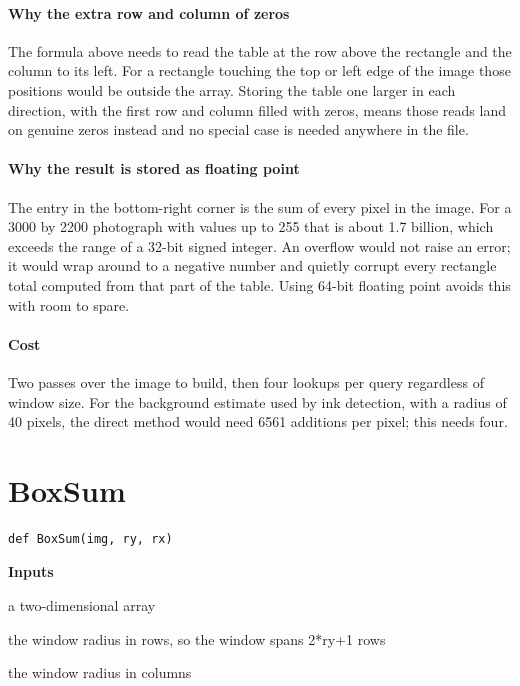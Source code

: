 \paragraph{Why the extra row and column of zeros}
The formula above needs to read the table at the row above the rectangle and the column to its left. For a rectangle touching the top or left edge of the image those positions would be outside the array. Storing the table one larger in each direction, with the first row and column filled with zeros, means those reads land on genuine zeros instead and no special case is needed anywhere in the file.


\paragraph{Why the result is stored as floating point}
The entry in the bottom-right corner is the sum of every pixel in the image. For a 3000 by 2200 photograph with values up to 255 that is about 1.7 billion, which exceeds the range of a 32-bit signed integer. An overflow would not raise an error; it would wrap around to a negative number and quietly corrupt every rectangle total computed from that part of the table. Using 64-bit floating point avoids this with room to spare.


\paragraph{Cost}
Two passes over the image to build, then four lookups per query regardless of window size. For the background estimate used by ink detection, with a radius of 40 pixels, the direct method would need 6561 additions per pixel; this needs four.


\section{BoxSum}
\begin{lstlisting}[style=sig]
def BoxSum(img, ry, rx)
\end{lstlisting}

\noindent\textbf{Inputs}
\begin{description}[leftmargin=2.2em,style=nextline,font=\normalfont\ttfamily]\setlength\itemsep{1pt}
  \item[{img}] \normalfont a two-dimensional array
  \item[{ry}] \normalfont the window radius in rows, so the window spans 2*ry+1 rows
  \item[{rx}] \normalfont the window radius in columns
\end{description}

